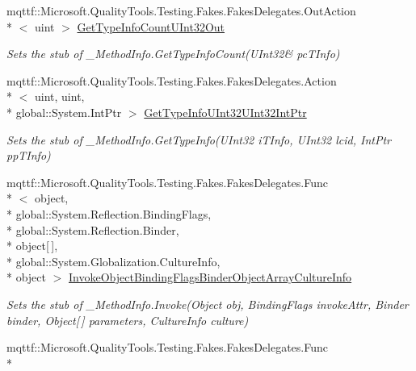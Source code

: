 \begin{DoxyCompactItemize}
mqttf\-::\-Microsoft.\-Quality\-Tools.\-Testing.\-Fakes.\-Fakes\-Delegates.\-Out\-Action\\*
$<$ uint $>$ \hyperlink{class_system_1_1_runtime_1_1_interop_services_1_1_fakes_1_1_stub___method_info_a91f938d37ca585ee8e616404503d6ff3}{Get\-Type\-Info\-Count\-U\-Int32\-Out}
\begin{DoxyCompactList}\small\item\em Sets the stub of \-\_\-\-Method\-Info.\-Get\-Type\-Info\-Count(U\-Int32\& pc\-T\-Info)\end{DoxyCompactList}\item 
mqttf\-::\-Microsoft.\-Quality\-Tools.\-Testing.\-Fakes.\-Fakes\-Delegates.\-Action\\*
$<$ uint, uint, \\*
global\-::\-System.\-Int\-Ptr $>$ \hyperlink{class_system_1_1_runtime_1_1_interop_services_1_1_fakes_1_1_stub___method_info_a1078cd2608c71623b13364cc178da640}{Get\-Type\-Info\-U\-Int32\-U\-Int32\-Int\-Ptr}
\begin{DoxyCompactList}\small\item\em Sets the stub of \-\_\-\-Method\-Info.\-Get\-Type\-Info(\-U\-Int32 i\-T\-Info, U\-Int32 lcid, Int\-Ptr pp\-T\-Info)\end{DoxyCompactList}\item 
mqttf\-::\-Microsoft.\-Quality\-Tools.\-Testing.\-Fakes.\-Fakes\-Delegates.\-Func\\*
$<$ object, \\*
global\-::\-System.\-Reflection.\-Binding\-Flags, \\*
global\-::\-System.\-Reflection.\-Binder, \\*
object\mbox{[}$\,$\mbox{]}, \\*
global\-::\-System.\-Globalization.\-Culture\-Info, \\*
object $>$ \hyperlink{class_system_1_1_runtime_1_1_interop_services_1_1_fakes_1_1_stub___method_info_a4aafd3e060fee8e95fba50dc07370810}{Invoke\-Object\-Binding\-Flags\-Binder\-Object\-Array\-Culture\-Info}
\begin{DoxyCompactList}\small\item\em Sets the stub of \-\_\-\-Method\-Info.\-Invoke(\-Object obj, Binding\-Flags invoke\-Attr, Binder binder, Object\mbox{[}$\,$\mbox{]} parameters, Culture\-Info culture)\end{DoxyCompactList}\item 
mqttf\-::\-Microsoft.\-Quality\-Tools.\-Testing.\-Fakes.\-Fakes\-Delegates.\-Func\\*

\end{DoxyCompactItemize}
